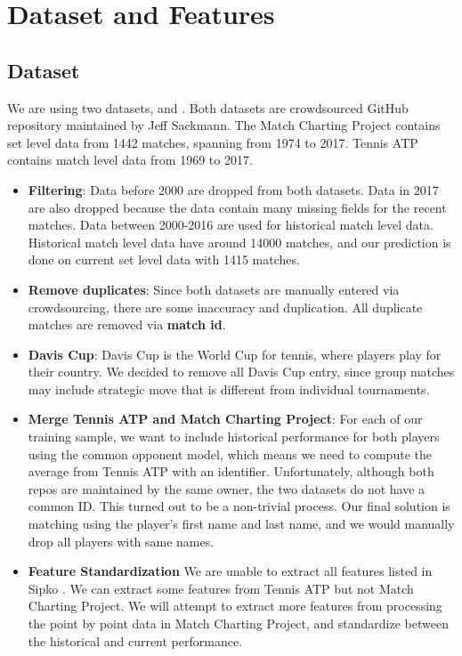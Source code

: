 \documentclass[paper=a4, fontsize=11pt]{scrartcl} %
\numberwithin{equation}{section} %
\numberwithin{figure}{section} %
\numberwithin{table}{section} %
\begin{document}
\section{Dataset and Features}
\subsection{Dataset}
We are using two datasets, \cite{tennis_atp} and \cite{tennis_charting}.  Both datasets are crowdsourced GitHub repository maintained by Jeff Sackmann.  The Match Charting Project contains set level data from 1442 matches, spanning from 1974 to 2017.  Tennis ATP contains match level data from 1969 to 2017.
\begin{itemize}
\item \textbf{Filtering}: Data before 2000 are dropped from both datasets.  Data in 2017 are also dropped because the data contain many missing fields for the recent matches.  Data between 2000-2016 are used for historical match level data.  Historical match level data have around 14000 matches, and our prediction is done on current set level data with 1415 matches.
\item \textbf{Remove duplicates}: Since both datasets are manually entered via crowdsourcing, there are some inaccuracy and duplication.  All duplicate matches are removed via \textbf{match id}.
\item \textbf{Davis Cup}: Davis Cup is the World Cup for tennis, where players play for their country.  We decided to remove all Davis Cup entry, since group matches may include strategic move that is different from individual tournaments.
\item \textbf{Merge Tennis ATP and Match Charting Project}: For each of our training sample, we want to include historical performance for both players using the common opponent model, which means we need to compute the average from Tennis ATP with an identifier.  Unfortunately, although both repos are maintained by the same owner, the two datasets do not have a common ID.  This turned out to be a non-trivial process.  Our final solution is matching using the player's first name and last name, and we would manually drop all players with same names.
\item \textbf{Feature Standardization} We are unable to extract all features listed in Sipko \cite{tennis1}.  We can extract some features from Tennis ATP but not Match Charting Project.  We will attempt to extract more features from processing the point by point data in Match Charting Project, and standardize between the historical and current performance.
\end{itemize}
\end{document}
